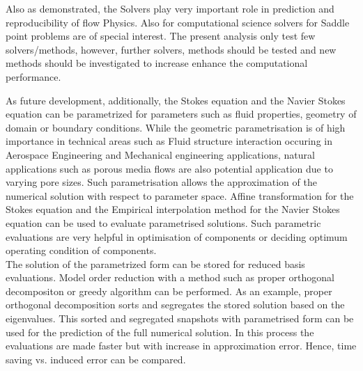 \documentclass[a4paper,openany]{book}
\begin{document}
Also as demonstrated, the Solvers play very important role in prediction and reproducibility of flow Physics. Also for computational science solvers for Saddle point problems are of special interest. The present analysis only test few solvers/methods, however, further solvers, methods should be tested and new methods should be investigated to increase enhance the computational performance.

As future development, additionally, the Stokes equation and the Navier Stokes equation can be parametrized for parameters such as fluid properties, geometry of domain or boundary conditions. While the geometric parametrisation is of high importance in technical areas such as Fluid structure interaction occuring in Aerospace Engineering and Mechanical engineering applications, natural applications such as porous media flows are also potential application due to varying pore sizes. Such parametrisation allows the approximation of the numerical solution with respect to parameter space. Affine transformation for the Stokes equation and the Empirical interpolation method for the Navier Stokes equation can be used to evaluate parametrised solutions. Such parametric evaluations are very helpful in optimisation of components or deciding optimum operating condition of components. \\

The solution of the parametrized form can be stored for reduced basis evaluations. Model order reduction with a method such as proper orthogonal decompositon or greedy algorithm can be performed. As an example, proper orthogonal decomposition sorts and segregates the stored solution based on the eigenvalues. This sorted and segregated snapshots with parametrised form can be used for the prediction of the full numerical solution. In this process the evaluations are made faster but with increase in approximation error. Hence, time saving vs. induced error can be compared.

\newpage
\end{document}
